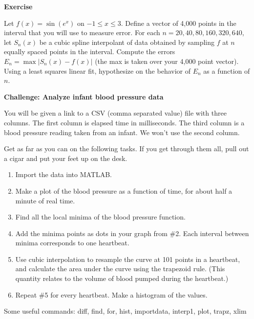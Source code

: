 \documentclass[11pt]{article}
\begin{document}
\begin{center}
  \bf Exercise
\end{center}

Let $f(x)=\sin(e^x)$ on $-1\le x \le 3$. Define a vector of
  4,000 points in the interval that you will use to measure error. For
  each $n=20,40,80,160,320,640$, let $S_n(x)$ be a cubic spline interpolant
  of data obtained by sampling $f$ at $n$ equally spaced points in the
  interval. Compute the errors $E_n = \max |S_n(x)-f(x)|$ (the max is
  taken over your 4,000 point vector). Using a least squares linear
  fit, hypothesize on the behavior of $E_n$ as a function of $n$. 

\begin{center}
  \bf Challenge: Analyze infant blood pressure data
\end{center}

You will be given a link to a CSV (comma separated value) file with three columns. The first column is elapsed time in milliseconds. The third column is a blood pressure reading taken from an infant. We won't use the second column.

Get as far as you can on the following tasks. If you get through them
all, pull out a cigar and put your feet up on the desk. 

\begin{enumerate}
\item Import the data into MATLAB.
\item Make a plot of the blood pressure as a function of time, for about half a minute of real time. 
\item Find all the local minima of the blood pressure function.
\item Add the minima points as dots in your graph from \#2. Each
  interval between minima corresponds to one heartbeat. 
\item Use cubic
  interpolation to resample the curve at 101 points in a heartbeat,
  and calculate the area under the curve using the trapezoid
  rule. (This quantity relates to the volume of blood pumped during
  the heartbeat.) 
\item Repeat \#5 for every heartbeat. Make a histogram of the values.
\end{enumerate}

Some useful commands: diff, find, for, hist, importdata, interp1, plot, trapz, xlim 
\end{document}
